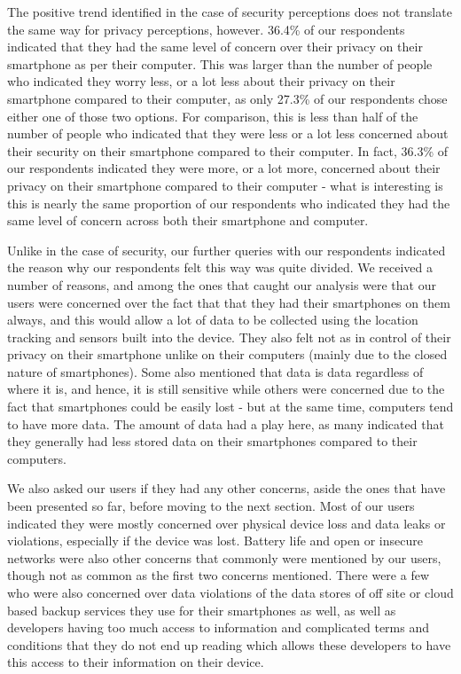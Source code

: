 \documentclass{sigchi}
\begin{document}
\begin{itemize}
The positive trend identified in the case of security perceptions does not translate the same way for privacy perceptions, however. 36.4\% of our respondents indicated that they had the same level of concern over their privacy on their smartphone as per their computer. This was larger than the number of people who indicated they worry less, or a lot less about their privacy on their smartphone compared to their computer, as only 27.3\% of our respondents chose either one of those two options. For comparison, this is less than half of the number of people who indicated that they were less or a lot less concerned about their security on their smartphone compared to their computer. In fact, 36.3\% of our respondents indicated they were more, or a lot more, concerned about their privacy on their smartphone compared to their computer - what is interesting is this is nearly the same proportion of our respondents who indicated they had the same level of concern across both their smartphone and computer.

Unlike in the case of security, our further queries with our respondents indicated the reason why our respondents felt this way was quite divided. We received a number of reasons, and among the ones that caught our analysis were that our users were concerned over the fact that that they had their smartphones on them always, and this would allow a lot of data to be collected using the location tracking and sensors built into the device. They also felt not as in control of their privacy on their smartphone unlike on their computers (mainly due to the closed nature of smartphones). Some also mentioned that data is data regardless of where it is, and hence, it is still sensitive while others were concerned due to the fact that smartphones could be easily lost - but at the same time, computers tend to have more data. The amount of data had a play here, as many indicated that they generally had less stored data on their smartphones compared to their computers.

\end{itemize}


We also asked our users if they had any other concerns, aside the ones that have been presented so far, before moving to the next section. Most of our users indicated they were mostly concerned over physical device loss and data leaks or violations, especially if the device was lost. Battery life and open or insecure networks were also other concerns that commonly were mentioned by our users, though not as common as the first two concerns mentioned. There were a few who were also concerned over data violations of the data stores of off site or cloud based backup services they use for their smartphones as well, as well as developers having too much access to information and complicated terms and conditions that they do not end up reading which allows these developers to have this access to their information on their device.
\end{document}
